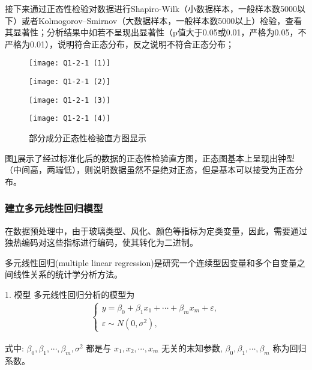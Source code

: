 接下来通过正态性检验对数据进行Shapiro-Wilk（小数据样本，一般样本数5000以下）或者Kolmogorov–Smirnov（大数据样本，一般样本数5000以上）检验，查看其显著性；分析结果中如若不呈现出显著性（p值大于0.05或0.01，严格为0.05，不严格为0.01），说明符合正态分布，反之说明不符合正态分布；

\begin{figure}[h]
	\centering
	\begin{minipage}[b]{0.22\linewidth}
		\texttt{[image: Q1-2-1 (1)]}
	\end{minipage}
	\begin{minipage}[b]{0.22\linewidth}
		\texttt{[image: Q1-2-1 (2)]}
	\end{minipage}
	\begin{minipage}[b]{0.22\linewidth}
		\texttt{[image: Q1-2-1 (3)]}
	\end{minipage}
	\begin{minipage}[b]{0.22\linewidth}
		\texttt{[image: Q1-2-1 (4)]}
	\end{minipage}
	\caption{部分成分正态性检验直方图显示}
	\label{p-6}
\end{figure}

图\ref{p-6}展示了经过标准化后的数据的正态性检验直方图，正态图基本上呈现出钟型（中间高，两端低），则说明数据虽然不是绝对正态，但是基本可以接受为正态分布。

\subsubsection{建立多元线性回归模型}
在数据预处理中，由于玻璃类型、风化、颜色等指标为定类变量，因此，需要通过独热编码对这些指标进行编码，使其转化为二进制。

多元线性回归(multiple linear regression)是研究一个连续型因变量和多个自变量之间线性关系的统计学分析方法。

1. 模型
多元线性回归分析的模型为
\begin{align}
	\left\{\begin{array}{l}
		y=\beta_0+\beta_1 x_1+\cdots+\beta_m x_m+\varepsilon, \\
		\varepsilon \sim N\left(0, \sigma^2\right),
	\end{array}\right.
\end{align}


式中: $\beta_0, \beta_1, \cdots, \beta_m, \sigma^2$ 都是与 $x_1, x_2, \cdots, x_m$ 无关的末知参数, $\beta_0, \beta_1, \cdots, \beta_m$ 称为回归 系数。

